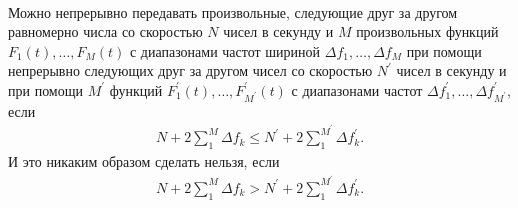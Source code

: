 \paragraph{}

\begin{theorem}\label{bezianova_theor_7} Можно непрерывно передавать произвольные, следующие друг за другом равномерно числа со скоростью $N$ чисел в секунду и $M$ произвольных функций $F_1(t), \ldots, F_M(t)$ с диапазонами частот шириной $\Delta f_1, \ldots, \Delta f_M$ при помощи непрерывно следующих друг за другом чисел со скоростью $N^{\prime}$ чисел в секунду и при помощи $M^{\prime}$ функций $F_1^{\prime}(t), \ldots, F_{M^{\prime}}^{\prime}(t)$ с диапазонами частот $\Delta f_1^{\prime}, \ldots, \Delta f_{M^{\prime}}^{\prime}$, если
\begin{equation}\label{bezianova_eq_22}
\begin{gathered}
N+2 \sum_1^M \Delta f_k \leqslant N^{\prime}+2 \sum_1^{M^{\prime}} \Delta f_k^{\prime}.
\end{gathered}
\end{equation}
И это никаким образом сделать нельзя, если
\begin{equation}\label{bezianova_eq_23}
\begin{gathered}
N+2 \sum_1^M \Delta f_k>N^{\prime}+2 \sum_1^{M^{\prime}} \Delta f_k^{\prime}.
\end{gathered}
\end{equation}
\end{theorem}

